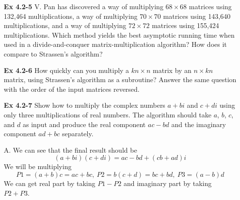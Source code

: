 \documentclass[fontsize=12pt,paper=a4]{book}
\begin{document}
\begin{enumerate}
 \item[\textbf{Ex 4.2-5}]
       V. Pan has discovered a way of multiplying $68 \times 68$ matrices using 132,464 multiplications, a way of multiplying $70 \times 70$ matrices using 143,640 multiplications, and a way of multiplying $72 \times 72$ matrices using 155,424 multiplications. Which method yields the best asymptotic running time when used in a divide-and-conquer matrix-multiplication algorithm? How does it compare to Strassen’s algorithm?
       
 \item[\textbf{Ex 4.2-6}]
       How quickly can you multiply a $k n \times n$ matrix by an $n \times k n$ matrix, using Strassen’s algorithm as a subroutine? Answer the same question with the order of the input matrices reversed.
       
 \item[\textbf{Ex 4.2-7}]
       Show how to multiply the complex numbers $a + bi$ and $c + di$ using only three multiplications of real numbers. The algorithm should take $a$, $b$, $c$, and $d$ as input and produce the real component $ac - bd$ and the imaginary component $ad + bc$ separately.
 \item[A.]
       We can see that the final result should be
       \[ (a+bi) (c+di) = ac-bd+(cb + ad)i \]
       We will be multiplying \\
       \[ P1 = (a+b)c = ac + bc,\ P2 = b(c+d) = bc + bd,\ P3 = (a-b)d \]
       We can get real part by taking $P1-P2$ and imaginary part by taking $P2+P3$.
\end{enumerate}
\end{document}

